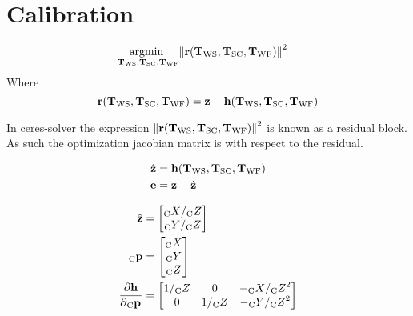 \chapter{Calibration}

\begin{align}
  \Argmin{\Tf{\world}{\sensor}, \Tf{\sensor}{\cam}, \Tf{\world}{\fiducial}}
  &\Norm{\Vec{r}(\Tf{\world}{\sensor}, \Tf{\sensor}{\cam}, \Tf{\world}{\fiducial})}^{2}
\end{align}
%
Where 
%
\begin{equation}
  \Vec{r}(\Tf{\world}{\sensor}, \Tf{\sensor}{\cam}, \Tf{\world}{\fiducial}) =
  \measurement - \projFunc(\Tf{\world}{\sensor}, \Tf{\sensor}{\cam}, \Tf{\world}{\fiducial})
\end{equation}

In ceres-solver the expression $\Norm{\Vec{r}(\Tf{\world}{\sensor},
\Tf{\sensor}{\cam}, \Tf{\world}{\fiducial})}^{2}$ is known as a residual block.
As such the optimization jacobian matrix is with respect to the residual.


\begin{align}
  \hat{\measurement} &=
    \projFunc(\Tf{\world}{\sensor},
              \Tf{\sensor}{\cam},
              \Tf{\world}{\fiducial}) \\
  \Vec{e} &= \measurement - \hat{\measurement}
\end{align}

\begin{align}
  \hat{\measurement}
		&=
			\begin{bmatrix}
				\KineNotationBare{X}{\cam} / \KineNotationBare{Z}{\cam} \\
				\KineNotationBare{Y}{\cam} / \KineNotationBare{Z}{\cam}
			\end{bmatrix} \\
  \Point{\cam}{\fiducial_{i}}
		&=
			\begin{bmatrix}
				\KineNotationBare{X}{\cam} \\
				\KineNotationBare{Y}{\cam} \\
				\KineNotationBare{Z}{\cam}
			\end{bmatrix} \\
  \dfrac{\partial{\projFunc}}{\partial{\Pt{\cam}}}
		&=
			\begin{bmatrix}
				1 / \KineNotationBare{Z}{\cam}
				& 0
				& -\KineNotationBare{X}{\cam} / \KineNotationBare{Z}{\cam}^{2} \\
				0
				& 1 / \KineNotationBare{Z}{\cam}
				& -\KineNotationBare{Y}{\cam} / \KineNotationBare{Z}{\cam}^{2}
			\end{bmatrix}
\end{align}

